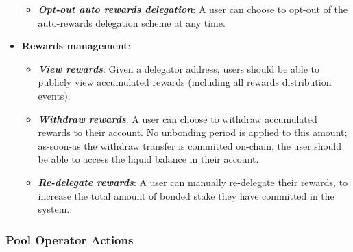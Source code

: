 \begin{itemize}
\begin{itemize}
        \item \textit{\textbf{Opt-out auto rewards delegation}}: A user can choose to opt-out of the auto-rewards delegation scheme at any time.  
    \end{itemize}
    \item \textbf{Rewards management}: 
    \begin{itemize}
        \item \textit{\textbf{View rewards}}: Given a delegator address, users should be able to publicly view accumulated rewards (including all rewards distribution events).  
        \item \textit{\textbf{Withdraw rewards}}: A user can choose to withdraw accumulated rewards to their account. No unbonding period is applied to this amount; as-soon-as the withdraw transfer is committed on-chain, the user should be able to access the liquid balance in their account. 
        \item \textit{\textbf{Re-delegate rewards}}: A user can manually re-delegate their rewards, to increase the total amount of bonded stake they have committed in the system.   
    \end{itemize}
\end{itemize}


\subsubsection{Pool Operator Actions} \label{pool_actions}


